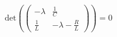 \documentclass[preview]{standalone}
\begin{document}
\begin{center}
\(\text{det}\left( \begin{pmatrix}
            -\lambda & \frac{1}{C} \\
            \frac{1}{L} & -\lambda - \frac{R}{L}
            \end{pmatrix} \right) = 0\)
\end{center}
\end{document}
